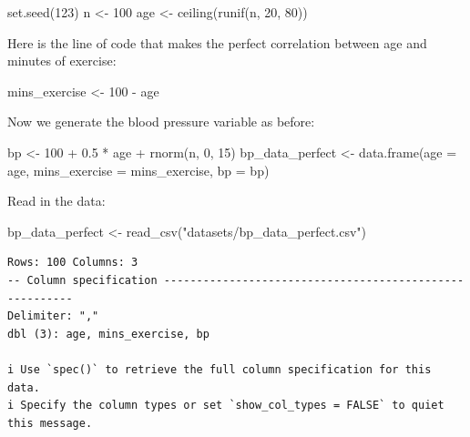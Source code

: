 \documentclass[
  letterpaper,
  8pt,
  a4paper]{book}
\newenvironment{Shaded}{\begin{snugshade}}{\end{snugshade}}
\newcommand{\AttributeTok}[1]{\textcolor[rgb]{0.40,0.45,0.13}{#1}}
\newcommand{\DecValTok}[1]{\textcolor[rgb]{0.68,0.00,0.00}{#1}}
\newcommand{\FloatTok}[1]{\textcolor[rgb]{0.68,0.00,0.00}{#1}}
\newcommand{\FunctionTok}[1]{\textcolor[rgb]{0.28,0.35,0.67}{#1}}
\newcommand{\NormalTok}[1]{\textcolor[rgb]{0.00,0.23,0.31}{#1}}
\newcommand{\OtherTok}[1]{\textcolor[rgb]{0.00,0.23,0.31}{#1}}
\newcommand{\SpecialCharTok}[1]{\textcolor[rgb]{0.37,0.37,0.37}{#1}}
\newcommand{\StringTok}[1]{\textcolor[rgb]{0.13,0.47,0.30}{#1}}
\begin{document}
\begin{Shaded}
\begin{Highlighting}[]
\FunctionTok{set.seed}\NormalTok{(}\DecValTok{123}\NormalTok{)}
\NormalTok{n }\OtherTok{\textless{}{-}} \DecValTok{100}
\NormalTok{age }\OtherTok{\textless{}{-}} \FunctionTok{ceiling}\NormalTok{(}\FunctionTok{runif}\NormalTok{(n, }\DecValTok{20}\NormalTok{, }\DecValTok{80}\NormalTok{))}
\end{Highlighting}
\end{Shaded}

Here is the line of code that makes the perfect correlation between age
and minutes of exercise:

\begin{Shaded}
\begin{Highlighting}[]
\NormalTok{mins\_exercise }\OtherTok{\textless{}{-}} \DecValTok{100} \SpecialCharTok{{-}}\NormalTok{ age}
\end{Highlighting}
\end{Shaded}

Now we generate the blood pressure variable as before:

\begin{Shaded}
\begin{Highlighting}[]
\NormalTok{bp }\OtherTok{\textless{}{-}} \DecValTok{100} \SpecialCharTok{+} \FloatTok{0.5} \SpecialCharTok{*}\NormalTok{ age }\SpecialCharTok{+} \FunctionTok{rnorm}\NormalTok{(n, }\DecValTok{0}\NormalTok{, }\DecValTok{15}\NormalTok{)}
\NormalTok{bp\_data\_perfect }\OtherTok{\textless{}{-}} \FunctionTok{data.frame}\NormalTok{(}\AttributeTok{age =}\NormalTok{ age,}
                              \AttributeTok{mins\_exercise =}\NormalTok{ mins\_exercise,}
                              \AttributeTok{bp =}\NormalTok{ bp)}
\end{Highlighting}
\end{Shaded}

Read in the data:

\begin{Shaded}
\begin{Highlighting}[]
\NormalTok{bp\_data\_perfect }\OtherTok{\textless{}{-}} \FunctionTok{read\_csv}\NormalTok{(}\StringTok{"datasets/bp\_data\_perfect.csv"}\NormalTok{)}
\end{Highlighting}
\end{Shaded}

\begin{verbatim}
Rows: 100 Columns: 3
-- Column specification --------------------------------------------------------
Delimiter: ","
dbl (3): age, mins_exercise, bp

i Use `spec()` to retrieve the full column specification for this data.
i Specify the column types or set `show_col_types = FALSE` to quiet this message.
\end{verbatim}
\end{document}
